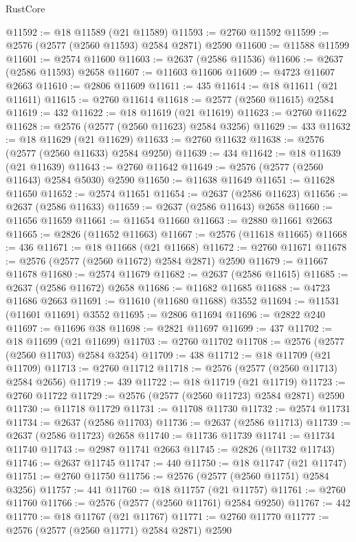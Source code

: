 \begin{lexlean}{RustCore}
\begin{coremodule}
@11592 := @18 @11589 (@21 @11589)
@11593 := @2760 @11592
@11599 := @2576 (@2577 (@2560 @11593) @2584 @2871) @2590
@11600 := @11588 @11599
@11601 := @2574 @11600
@11603 := @2637 (@2586 @11536)
@11606 := @2637 (@2586 @11593) @2658
@11607 := @11603 @11606
@11609 := @4723 @11607 @2663
@11610 := @2806 @11609
@11611 := 435
@11614 := @18 @11611 (@21 @11611)
@11615 := @2760 @11614
@11618 := @2577 (@2560 @11615) @2584
@11619 := 432
@11622 := @18 @11619 (@21 @11619)
@11623 := @2760 @11622
@11628 := @2576 (@2577 (@2560 @11623) @2584 @3256)
@11629 := 433
@11632 := @18 @11629 (@21 @11629)
@11633 := @2760 @11632
@11638 := @2576 (@2577 (@2560 @11633) @2584 @9250)
@11639 := 434
@11642 := @18 @11639 (@21 @11639)
@11643 := @2760 @11642
@11649 := @2576 (@2577 (@2560 @11643) @2584 @5030) @2590
@11650 := @11638 @11649
@11651 := @11628 @11650
@11652 := @2574 @11651
@11654 := @2637 (@2586 @11623)
@11656 := @2637 (@2586 @11633)
@11659 := @2637 (@2586 @11643) @2658
@11660 := @11656 @11659
@11661 := @11654 @11660
@11663 := @2880 @11661 @2663
@11665 := @2826 (@11652 @11663)
@11667 := @2576 (@11618 @11665)
@11668 := 436
@11671 := @18 @11668 (@21 @11668)
@11672 := @2760 @11671
@11678 := @2576 (@2577 (@2560 @11672) @2584 @2871) @2590
@11679 := @11667 @11678
@11680 := @2574 @11679
@11682 := @2637 (@2586 @11615)
@11685 := @2637 (@2586 @11672) @2658
@11686 := @11682 @11685
@11688 := @4723 @11686 @2663
@11691 := @11610 (@11680 @11688) @3552
@11694 := @11531 (@11601 @11691) @3552
@11695 := @2806 @11694
@11696 := @2822 @240
@11697 := @11696 @38
@11698 := @2821 @11697
@11699 := 437
@11702 := @18 @11699 (@21 @11699)
@11703 := @2760 @11702
@11708 := @2576 (@2577 (@2560 @11703) @2584 @3254)
@11709 := 438
@11712 := @18 @11709 (@21 @11709)
@11713 := @2760 @11712
@11718 := @2576 (@2577 (@2560 @11713) @2584 @2656)
@11719 := 439
@11722 := @18 @11719 (@21 @11719)
@11723 := @2760 @11722
@11729 := @2576 (@2577 (@2560 @11723) @2584 @2871) @2590
@11730 := @11718 @11729
@11731 := @11708 @11730
@11732 := @2574 @11731
@11734 := @2637 (@2586 @11703)
@11736 := @2637 (@2586 @11713)
@11739 := @2637 (@2586 @11723) @2658
@11740 := @11736 @11739
@11741 := @11734 @11740
@11743 := @2987 @11741 @2663
@11745 := @2826 (@11732 @11743)
@11746 := @2637 @11745
@11747 := 440
@11750 := @18 @11747 (@21 @11747)
@11751 := @2760 @11750
@11756 := @2576 (@2577 (@2560 @11751) @2584 @3256)
@11757 := 441
@11760 := @18 @11757 (@21 @11757)
@11761 := @2760 @11760
@11766 := @2576 (@2577 (@2560 @11761) @2584 @9250)
@11767 := 442
@11770 := @18 @11767 (@21 @11767)
@11771 := @2760 @11770
@11777 := @2576 (@2577 (@2560 @11771) @2584 @2871) @2590

\end{coremodule}
\end{lexlean}
